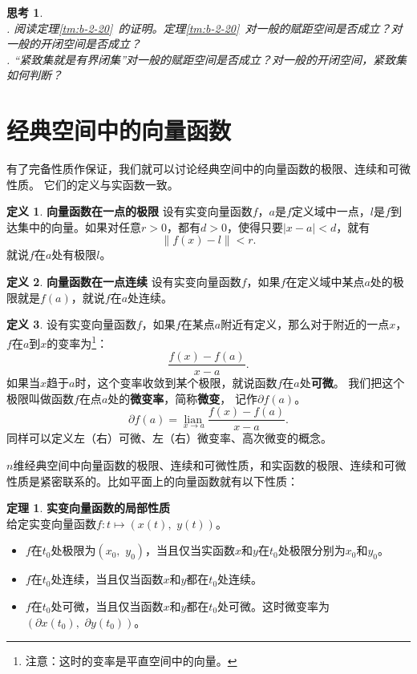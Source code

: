 \documentclass[12pt,UTF8]{ctexbook}
\newcommand{\lian}[1]{
    \underset{#1}{\operatorname{lian}\,}
}
\theoremstyle{definition}
\newtheorem{df}{定义}[section]
\newtheorem{tm}{定理}[section]
\theoremstyle{plain}
\newtheorem{sk}{思考}[section]
\begin{document}
\begin{appendix}
\begin{sk}
    \mbox{}\\
    . 阅读定理\ref{tm:b-2-20}~的证明。定理\ref{tm:b-2-20}~对一般的赋距空间是否成立？对一般的开闭空间是否成立？\\
    . “紧致集就是有界闭集”对一般的赋距空间是否成立？对一般的开闭空间，紧致集如何判断？
\end{sk}

\section{经典空间中的向量函数}
有了完备性质作保证，我们就可以讨论经典空间中的向量函数的极限、连续和可微性质。
它们的定义与实函数一致。
\begin{df}{\textbf{向量函数在一点的极限}}
    设有实变向量函数$f$，$a$是$f$定义域中一点，$l$是$f$到达集中的向量。如果对任意$r>0$，都有$d>0$，使得只要$|x - a| < d$，就有
    $$\left\|f(x) - l\right\| < r.$$
    就说$f$在$a$处有极限$l$。
\end{df}

\begin{df}{\textbf{向量函数在一点连续}}
    设有实变向量函数$f$，如果$f$在定义域中某点$a$处的极限就是$f(a)$，就说$f$在$a$处连续。
\end{df}

\begin{df}
    设有实变向量函数$f$，如果$f$在某点$a$附近有定义，那么对于附近的一点$x$，$f$在$a$到$x$的变率为\footnote{注意：这时的变率是平直空间中的向量。}：
    $$ \frac{f(x) - f(a)}{x - a}.$$
    如果当$x$趋于$a$时，这个变率收敛到某个极限，就说函数$f$在$a$处\textbf{可微}。
    我们把这个极限叫做函数$f$在点$a$处的\textbf{微变率}，简称\textbf{微变}，
    记作$\partial f(a)$。
    $$ \partial f(a) = \lian{{x\to a}} \frac{f(x) - f(a)}{x - a}. $$
    同样可以定义左（右）可微、左（右）微变率、高次微变的概念。
\end{df}

$n$维经典空间中向量函数的极限、连续和可微性质，和实函数的极限、连续和可微性质是紧密联系的。比如平面上的向量函数就有以下性质：
\begin{tm}\label{tm:b-1-10}
    \textbf{实变向量函数的局部性质}\\
    给定实变向量函数$f: t\mapsto (x(t),\,\, y(t))$。
    \begin{itemize}
        \item $f$在$t_0$处极限为$(x_0,\,\,y_0)$，当且仅当实函数$x$和$y$在$t_0$处极限分别为$x_0$和$y_0$。
        \item $f$在$t_0$处连续，当且仅当函数$x$和$y$都在$t_0$处连续。
        \item $f$在$t_0$处可微，当且仅当函数$x$和$y$都在$t_0$处可微。这时微变率为$(\partial x(t_0),\,\,\partial y(t_0))$。
    \end{itemize}
\end{tm}


\end{appendix}
\end{document}
